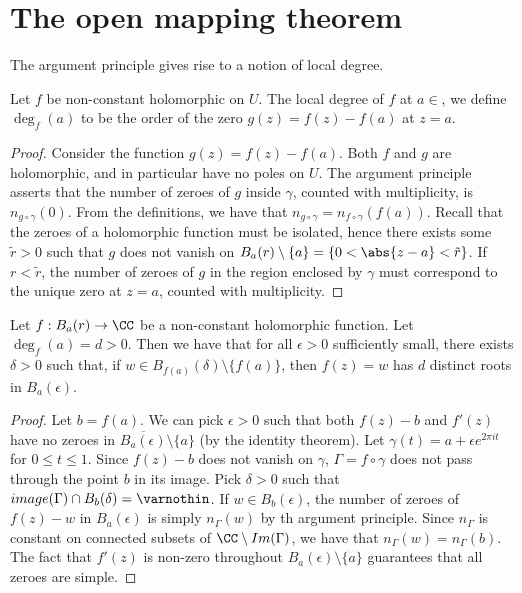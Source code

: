 \section{The open mapping theorem}

The argument principle gives rise to a notion of local degree.

\begin{definition}
  Let $f$ be non-constant holomorphic on $U$.
The local degree of $f$ at $a \in $, we define $\deg_f (a)$ to be the order of the zero $g(z) = f(z) - f(a)$ at $z = a$.
\end{definition}

\begin{lemma}
  We have the following equality:
\[
\deg_f (a) = n_{f \circ \gamma} \bigl(f (a) \bigr)
\]
where $\gamma(t) = a + r e^{\sqrt{2 \pi i t}$ for $0 \leq t \leq 1$, and $r > 0$ sufficiently small.
\end{lemma}

\begin{proof}
  Consider the function $g(z) = f(z) - f(a)$.
Both $f$ and $g$ are holomorphic, and in particular have no poles on $U$.
The argument principle asserts that the number of zeroes of $g$ inside $\gamma$, counted with multiplicity, is $n_{g \circ \gamma}(0)$.
From the definitions, we have that $n_{g \circ \gamma} = n_{f \circ \gamma}(f(a))$.
Recall that the zeroes of a holomorphic function must be isolated, hence there exists some $\tilde{r} > 0$ such that $g$ does not vanish on $B_a(r) \setminus \{ a \} = \{ 0 < \abs{z - a} < \tilde{r} \}$.
If $r < \tilde{r}$, the number of zeroes of $g$ in the region enclosed by $\gamma$ must correspond to the unique zero at $z = a$, counted with multiplicity.
\end{proof}

\begin{proposition}
  Let $f : B_a(r) \rightarrow \CC$ be a non-constant holomorphic function.
Let $\deg_f (a) = d > 0$. Then we have that for all $\epsilon > 0$ sufficiently small, there exists $\delta > 0$ such that, if $w \in B_{f(a)}(\delta) \setminus \{ f(a) \}$, then $f(z) = w$ has $d$ distinct roots in $B_a(\epsilon)$.
\end{proposition}

\begin{proof}
  Let $b = f(a)$. We can pick $\epsilon > 0$ such that both $f(z) - b$ and $f'(z)$ have no zeroes in $\overline{B_a(\epsilon)} \setminus \{ a \}$ (by the identity theorem).
  Let $\gamma(t) = a + \epsilon e^{2 \pi i t}$ for $0 \leq t \leq 1$.
Since $f(z) - b$ does not vanish on $\gamma$, $\Gamma = f \circ \gamma$ does not pass through the point $b$ in its image.
Pick $\delta > 0$ such that $\mathop{image}(\Gamma) \cap B_b(\delta) = \varnothin$.
If $w \in B_b(\epsilon)$, the number of zeroes of $f(z) - w$ in $B_a(\epsilon)$ is simply $n_\Gamma (w)$ by th argument principle.
Since $n_\Gamma$ is constant on connected subsets of $\CC \setminus \mathop{Im}(\Gamma)$, we have that $n_\Gamma(w) = n_\Gamma(b)$.
The fact that $f'(z)$ is non-zero throughout $B_a(\epsilon) \setminus \{ a \}$ guarantees that all zeroes are simple.
\end{proof}

